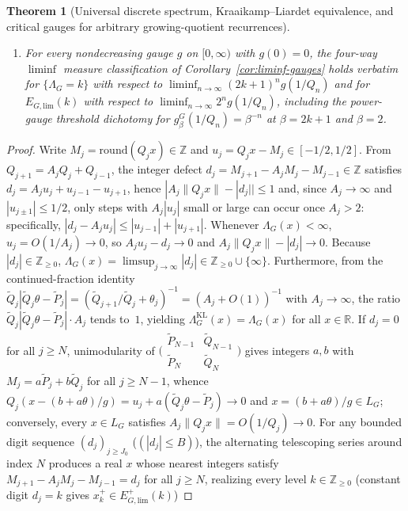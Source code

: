 \documentclass[11pt]{article}
\newtheorem{theorem}{Theorem}
\theoremstyle{definition}
\theoremstyle{remark}
\newcommand{\R}{\mathbb{R}}
\newcommand{\Z}{\mathbb{Z}}
\newcommand{\Lam}{\Lambda}
\begin{document}
\begin{theorem}[Universal discrete spectrum, Kraaikamp--Liardet equivalence, and critical gauges for arbitrary growing-quotient recurrences]
\begin{enumerate}[label=(\roman*),leftmargin=2.2em]
\begin{enumerate}[label=(\alph*),leftmargin=1.6em]
$E_{G,\mathrm{lim}}^\pm(k)=x_k^\pm+L_G$ for explicit telescoping witnesses
$x_k^\pm\in E_{G,\mathrm{lim}}^\pm(k)$; and
\item For every nondecreasing gauge $g$ on $[0,\infty)$ with $g(0)=0$, the four-way
$\liminf$ measure classification of Corollary~\ref{cor:liminf-gauges} holds verbatim
for $\{\Lam_G=k\}$ with respect to $\liminf_{n\to\infty}(2k+1)^n g(1/Q_n)$ and for
$E_{G,\mathrm{lim}}(k)$ with respect to $\liminf_{n\to\infty}2^n g(1/Q_n)$, including
the power-gauge threshold dichotomy for $g_\beta^G(1/Q_n)=\beta^{-n}$ at $\beta=2k+1$
and $\beta=2$.
\end{enumerate}
\end{enumerate}
\end{theorem}

\begin{proof}
Write $M_j=\mathrm{round}(Q_j x)\in\Z$ and $u_j=Q_j x-M_j\in[-1/2,1/2]$. From
$Q_{j+1}=A_jQ_j+Q_{j-1}$, the integer defect $d_j=M_{j+1}-A_jM_j-M_{j-1}\in\Z$
satisfies $d_j=A_ju_j+u_{j-1}-u_{j+1}$, hence $|A_j\|Q_j x\|-|d_j||\le 1$ and,
since $A_j\to\infty$ and $|u_{j\pm1}|\le 1/2$, only steps with $A_j|u_j|$ small or
large can occur once $A_j>2$: specifically, $|d_j-A_j u_j|\le|u_{j-1}|+|u_{j+1}|$.
Whenever $\Lam_G(x)<\infty$, $u_j=O(1/A_j)\to0$, so $A_j u_j-d_j\to0$ and
$A_j\|Q_j x\|-|d_j|\to0$. Because $|d_j|\in\Z_{\ge0}$, $\Lam_G(x)=\limsup_{j\to\infty}|d_j|\in\Z_{\ge0}\cup\{\infty\}$.
Furthermore, from the continued-fraction identity
$\widetilde Q_j|\widetilde Q_j\theta-\widetilde P_j|=(\widetilde Q_{j+1}/\widetilde Q_j+\theta_j)^{-1}=(A_j+O(1))^{-1}$
with $A_j\to\infty$, the ratio $\widetilde Q_j|\widetilde Q_j\theta-\widetilde P_j|\cdot A_j$
tends to~$1$, yielding $\Lam_G^{\mathrm{KL}}(x)=\Lam_G(x)$ for all $x\in\R$.
If $d_j=0$ for all $j\ge N$, unimodularity of
$\bigl(\begin{smallmatrix}\widetilde P_{N-1}&\widetilde Q_{N-1}\\\widetilde P_N&\widetilde Q_N\end{smallmatrix}\bigr)$
gives integers $a,b$ with $M_j=a\widetilde P_j+b\widetilde Q_j$ for all $j\ge N-1$,
whence $Q_j(x-(b+a\theta)/g)=u_j+a(\widetilde Q_j\theta-\widetilde P_j)\to0$ and
$x=(b+a\theta)/g\in L_G$; conversely, every $x\in L_G$ satisfies $A_j\|Q_j x\|=O(1/Q_j)\to0$.
For any bounded digit sequence $(d_j)_{j\ge J_0}$ ($(|d_j|\le B)$), the alternating
telescoping series around index $N$ produces a real $x$ whose nearest integers
satisfy $M_{j+1}-A_j M_j-M_{j-1}=d_j$ for all $j\ge N$, realizing every level
$k\in\Z_{\ge0}$ (constant digit $d_j=k$ gives $x_k^+\in E_{G,\mathrm{lim}}^+(k)$)

\end{proof}
\end{document}
